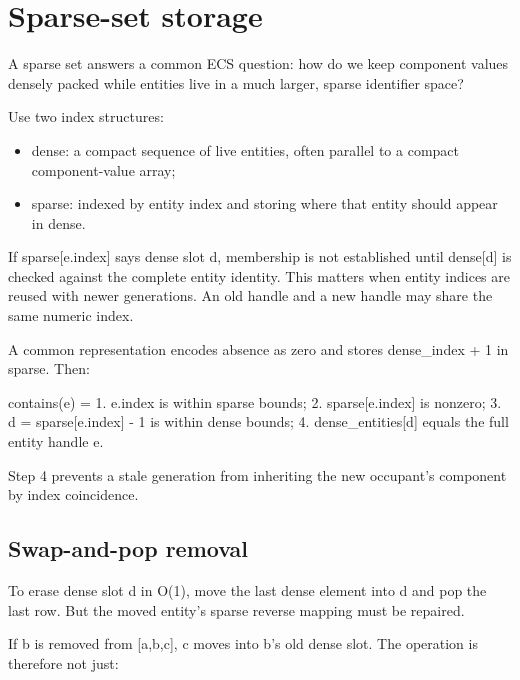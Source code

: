 \hypertarget{appendix-8404d0b1a3e7}{}\label{referencestart:appendix-8404d0b1a3e7}
\section{Sparse-set storage}\label{appendix-8404d0b1a3e7-sparse-set-storage}

\hypertarget{appendix-8404d0b1a3e7-sparse-set-storage}{}

A sparse set answers a common ECS question: how do we keep component values densely packed while entities live in a much larger, sparse identifier space?

Use two index structures:

\begin{itemize}
\tightlist
\item
  dense: a compact sequence of live entities, often parallel to a compact component-value array;
\item
  sparse: indexed by entity index and storing where that entity should appear in dense.
\end{itemize}

If sparse{[}e.index{]} says dense slot d, membership is not established until dense{[}d{]} is checked against the complete entity identity. This matters when entity indices are reused with newer generations. An old handle and a new handle may share the same numeric index.

A common representation encodes absence as zero and stores dense\_index + 1 in sparse. Then:

contains(e) = 1. e.index is within sparse bounds; 2. sparse{[}e.index{]} is nonzero; 3. d = sparse{[}e.index{]} - 1 is within dense bounds; 4. dense\_entities{[}d{]} equals the full entity handle e.

Step 4 prevents a stale generation from inheriting the new occupant's component by index coincidence.

\subsection{Swap-and-pop removal}\label{appendix-8404d0b1a3e7-swap-and-pop-removal}

\hypertarget{appendix-8404d0b1a3e7-swap-and-pop-removal}{}

To erase dense slot d in O(1), move the last dense element into d and pop the last row. But the moved entity's sparse reverse mapping must be repaired.

If b is removed from {[}a,b,c{]}, c moves into b's old dense slot. The operation is therefore not just:

